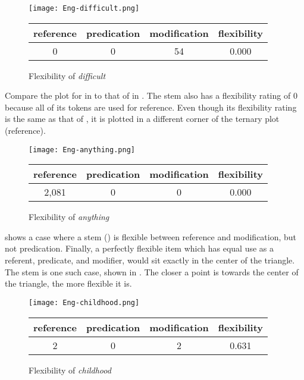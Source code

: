 \begin{figure}

  \centering
  \caption{Flexibility of  \textit{difficult}}
  \label{fig:Eng-difficult}

  \texttt{[image: Eng-difficult.png]}

  \begin{tabular}{ c c c c }
    \toprule
    reference & predication & modification & flexibility\\
    \midrule
    0         & 0           & 54           & 0.000      \\
    \bottomrule
  \end{tabular}

\end{figure}

Compare the plot for  in  to that of  in . The stem  also has a flexibility rating of $0$ because all of its tokens are used for reference. Even though its flexibility rating is the same as that of , it is plotted in a different corner of the ternary plot (reference).

\begin{figure}

  \centering
  \caption{Flexibility of  \textit{anything}}
  \label{fig:Eng-anything}

  \texttt{[image: Eng-anything.png]}

  \begin{tabular}{ c c c c }
    \toprule
    reference & predication & modification & flexibility\\
    \midrule
    2,081     & 0           & 0            & 0.000      \\
    \bottomrule
  \end{tabular}

\end{figure}

 shows a case where a stem () is flexible between reference and modification, but not predication. Finally, a perfectly flexible item which has equal use as a referent, predicate, and modifier, would sit exactly in the center of the triangle. The  stem   is one such case, shown in . The closer a point is towards the center of the triangle, the more flexible it is.

\begin{figure}

  \centering
  \caption{Flexibility of  \textit{childhood}}
  \label{fig:Eng-childhood}

  \texttt{[image: Eng-childhood.png]}

  \begin{tabular}{ c c c c }
    \toprule
    reference & predication & modification & flexibility\\
    \midrule
    2         & 0           & 2            & 0.631      \\
    \bottomrule
  \end{tabular}

\end{figure}

